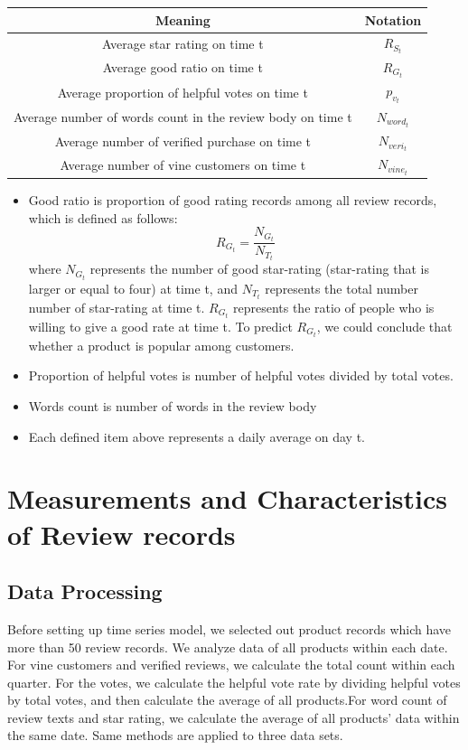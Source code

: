 \documentclass[12pt]{article}
\begin{document}
\begin{table}[h!]
\centering
 \begin{tabular}{|| c c||} 
 \hline
 Meaning & Notation \\ [0.5ex] 
 \hline\hline
Average star rating on time t & $R_{S_{t}}$ \\[0.5ex]
Average good ratio on time t & $R_{G_{t}}$\\ [0.5ex]
Average proportion of helpful votes on time t & $p_{v_{t}}$\\[0.5ex]
Average number of words count in the review body on time t & $N_{word_{t}}$ \\[0.5ex]
Average number of verified purchase on time t & $N_{veri_{t}}$\\[0.5ex]
Average number of vine customers on time t & $N_{vine_{t}}$\\
 \hline
 \end{tabular}
\end{table}
\begin{itemize}
    \item Good ratio is proportion of good rating records among all review records, which is defined as follows:
    \begin{equation*}
        R_{G_{t}} = \dfrac{N_{G_{t}}}{N_{T_{t}}}
    \end{equation*}
    where $N_{G_{t}}$ represents the number of good star-rating (star-rating that is larger or equal to four) at time t, and $N_{T_{t}}$ represents the total number number of star-rating at time t.
    $R_{G_{t}}$ represents the ratio of people who is willing to give a good rate at time t. To predict $R_{G_{t}}$, we could conclude that whether a product is popular among customers.
    \item Proportion of helpful votes is number of helpful votes divided by total votes.
    \item Words count is number of words in the review body
    \item Each defined item above represents a daily average on day t.
\end{itemize}

\newpage
\section{Measurements and Characteristics of Review records}
\subsection{Data Processing}
Before setting up time series model, we selected out product records which have more than 50 review records. We analyze data of all products within each date. For vine customers and verified reviews, we calculate the total count within each quarter. For the votes, we calculate the helpful vote rate by dividing helpful votes by total votes, and then calculate the average of all products.For word count of review texts and star rating, we calculate the average of all products' data within the same date. Same methods are applied to three data sets.
\end{document}
